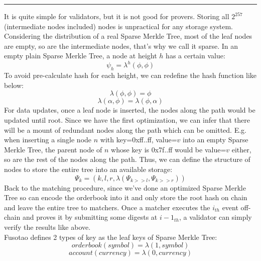 \documentclass[a4paper,12pt]{article}
\begin{document}
\noindent\rule{\textwidth}{0.5pt}
It is quite simple for validators, but it is not good for provers. Storing all \(2^{257}\) (intermediate nodes included) nodes is unpractical for any storage system. Considering the distribution of a real Sparse Merkle Tree, most of the leaf nodes are empty, so are the intermediate nodes, that’s why we call it sparse. In an empty plain Sparse Merkle Tree, a node at height \(h\) has a certain value:\\
\begin{equation*}
    \psi_{h} = \lambda^{h}(\phi, \phi)
\end{equation*}
To avoid pre-calculate hash for each height, we can redefine the hash function like below:\\
\begin{equation*}
    \lambda(\phi, \phi) = \phi
\end{equation*}
\begin{equation*}
    \lambda(\alpha, \phi) = \lambda(\phi, \alpha)
\end{equation*}
For data updates, once a leaf node is inserted, the nodes along the path would be updated until root. Since we have the first optimization, we can infer that there will be a mount of redundant nodes along the path which can be omitted. E.g. when inserting a single node \(n\) with key=0xff..ff, value=\(v\) into an empty Sparse Merkle Tree, the parent node of \(n\) whose key is 0x7f..ff would be value=\(v\) either, so are the rest of the nodes along the path. Thus, we can define the structure of nodes to store the entire tree into an available storage:\\
\begin{equation*}
    \Psi_{k} = (k, l, r, \lambda(\Psi_{k>>l}, \Psi_{k>>r}))
\end{equation*}
Back to the matching procedure, since we've done an optimized Sparse Merkle Tree so can encode the orderbook into it and only store the root hash on chain and leave the entire tree to matchers. Once a matcher executes the \(i_{th}\) event off-chain and proves it by submitting some digests at \(i-1_{th}\), a validator can simply verify the results like above.\\
Fusotao defines 2 types of key as the leaf keys of Sparse Merkle Tree:\\
\begin{equation*}
    orderbook(symbol) = \lambda(1, symbol)
\end{equation*}
\begin{equation*}
    account(currency) = \lambda(0, currency)
\end{equation*}
\end{document}
